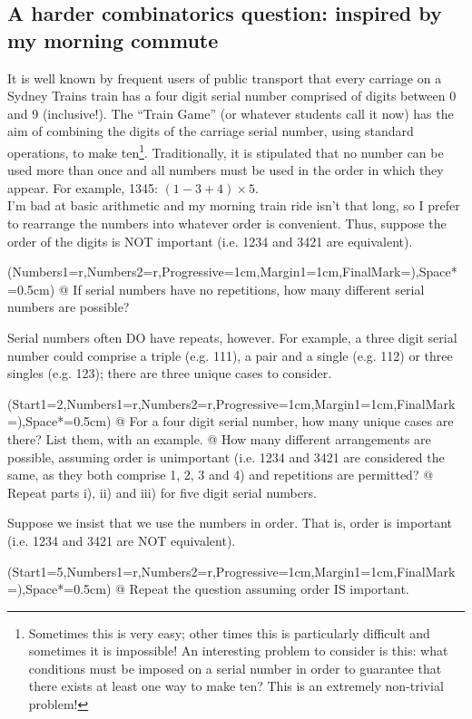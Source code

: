 \documentclass[a4paper,11pt]{article}
\begin{document}
\subsection*{A harder combinatorics question: inspired by my morning commute}
It is well known by frequent users of public transport that every carriage on a Sydney Trains train has a four digit serial number comprised of digits between 0 and 9 (inclusive!). The ``Train Game'' (or whatever students call it now) has the aim of combining the digits of the carriage serial number, using standard operations, to make ten\footnote{Sometimes this is very easy; other times this is particularly difficult and sometimes it is impossible! An interesting problem to consider is this: what conditions must be imposed on a serial number in order to guarantee that there exists at least one way to make ten? This is an extremely non-trivial problem!}. Traditionally, it is stipulated that no number can be used more than once and all numbers must be used in the order in which they appear. For example, 1345: $(1-3+4)\times5$.\\

\noindent I'm bad at basic arithmetic and my morning train ride isn't that long, so I prefer to rearrange the numbers into whatever order is convenient. Thus, suppose the order of the digits is NOT important (i.e. 1234 and 3421 are equivalent). \\
	\begin{easylist}[enumerate]
		\ListProperties(Numbers1=r,Numbers2=r,Progressive=1cm,Margin1=1cm,FinalMark={)},Space*=0.5cm)
		@ If serial numbers have no repetitions, how many different serial numbers are possible?
    \end{easylist}
    \vspace{0.5cm}
    \noindent Serial numbers often DO have repeats, however. For example, a three digit serial number could comprise a triple (e.g. 111), a pair and a single (e.g. 112) or three singles (e.g. 123); there are three unique cases to consider.\\
	\begin{easylist}[enumerate]
		\ListProperties(Start1=2,Numbers1=r,Numbers2=r,Progressive=1cm,Margin1=1cm,FinalMark={)},Space*=0.5cm)
        @ For a four digit serial number, how many unique cases are there? List them, with an example.
        @ How many different arrangements are possible, assuming order is unimportant (i.e. 1234 and 3421 are considered the same, as they both comprise 1, 2, 3 and 4) and repetitions are permitted?
        @ Repeat parts i), ii) and iii) for five digit serial numbers.
    \end{easylist}
    \vspace{0.5cm}
\noindent Suppose we insist that we use the numbers in order. That is, order is important (i.e. 1234 and 3421 are NOT equivalent). \\
	\begin{easylist}[enumerate]
		\ListProperties(Start1=5,Numbers1=r,Numbers2=r,Progressive=1cm,Margin1=1cm,FinalMark={)},Space*=0.5cm)
		@ Repeat the question assuming order IS important.
    \end{easylist}
    
\end{document}
